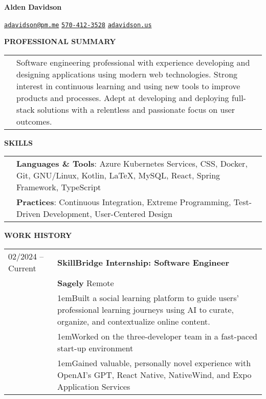 \documentclass[11pt]{article}
\newlength{\dateColumnWidth}
\newcommand{\customBulletLabel}{\raisebox{0.4ex}{\tiny$\bullet$}}
\newcommand{\detail}{\par\noindent\makebox[1em][l]{\customBulletLabel}\hangindent1em}
\begin{document}
\begin{center}
    \begin{minipage}{0.70\textwidth}
        {\Huge\textbf{Alden Davidson}}
    \end{minipage}%
    \begin{minipage}{0.30\textwidth}
        \raggedleft
        \href{mailto:adavidson@pm.me}{\nolinkurl{adavidson@pm.me}}
        \href{tel:5704123528}{\nolinkurl{570-412-3528}}
        \href{https://adavidson.us}{\nolinkurl{adavidson.us}}
    \end{minipage}
\end{center}
{\Large \textbf{PROFESSIONAL SUMMARY}}
\bigbreak
\begin{tabularx}{\textwidth}{@{}p{\dateColumnWidth}X@{}}
     & Software engineering professional with experience developing and designing applications using modern web technologies.
    Strong interest in continuous learning and using new tools to improve products and processes.
    Adept at developing and deploying full-stack solutions with a relentless and passionate focus on user outcomes.
\end{tabularx}
\bigbreak
{\Large \textbf{SKILLS}}
\bigbreak
\begin{tabularx}{\textwidth}{@{}p{\dateColumnWidth}X@{}}
     & \textbf{Languages \& Tools}: Azure Kubernetes Services, CSS, Docker, Git, GNU/Linux, Kotlin, \LaTeX, MySQL, React, Spring Framework, TypeScript \\
     & \textbf{Practices}: Continuous Integration, Extreme Programming, Test-Driven Development, User-Centered Design                                  \\
\end{tabularx}
\bigbreak
{\Large \textbf{WORK HISTORY}}
\bigbreak
\begin{tabularx}{\textwidth}{@{}p{\dateColumnWidth}X@{}}
    02/2024 -- Current & \textbf{SkillBridge Internship: Software Engineer}                                                                                                      \\
                       & \textbf{Sagely} \textbar{} Remote                                                                                                                       \\
                       & \detail Built a social learning platform to guide users' professional learning journeys using AI to curate, organize, and contextualize online content. \\
                       & \detail Worked on the three-developer team in a fast-paced start-up environment                                                                         \\
                       & \detail Gained valuable, personally novel experience with OpenAI's GPT, React Native, NativeWind, and Expo Application Services
\end{tabularx}
\end{document}
